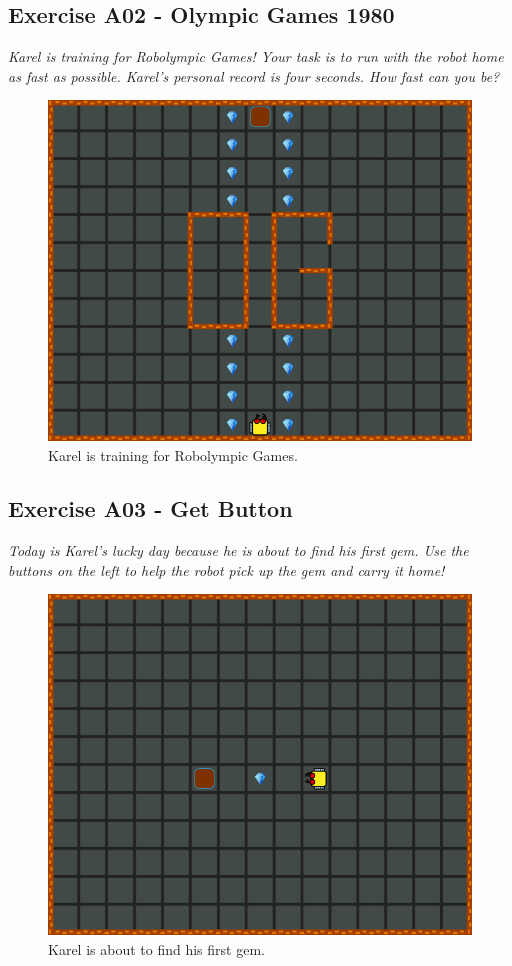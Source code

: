 \newpage
\subsection{Exercise A02 - Olympic Games 1980}

{\em Karel is training for Robolympic Games! Your task is to run with 
the robot home as fast as possible. Karel's personal record is four seconds. How fast can you be?}

\begin{figure}[!ht]
\begin{center}
\includegraphics[height=0.4\textwidth]{imgk/a02.png}
\end{center}
\vspace{-4mm}
\caption{Karel is training for Robolympic Games.}
\label{fig:a02}
\vspace{-4mm}
\end{figure}
\noindent

\subsection{Exercise A03 - Get Button}

{\em Today is Karel's lucky day because he is about to find his first gem. 
Use the buttons on the left to help the robot pick up the gem and carry it 
home!}

\begin{figure}[!ht]
\begin{center}
\includegraphics[height=0.4\textwidth]{imgk/a03.png}
\end{center}
\vspace{-4mm}
\caption{Karel is about to find his first gem.}
\label{fig:a03}
\vspace{-1cm}
\end{figure}
\noindent

